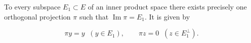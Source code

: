 To every subspace $E_1 \subset E$ of an inner product space there exists precisely one orthogonal projection $\pi$ such that $\operatorname{Im} \pi = E_1$. It is given by

$$\pi y = y \;\; (y \in E_1), \qquad \pi z = 0 \;\; (z \in E_1^\perp).$$
